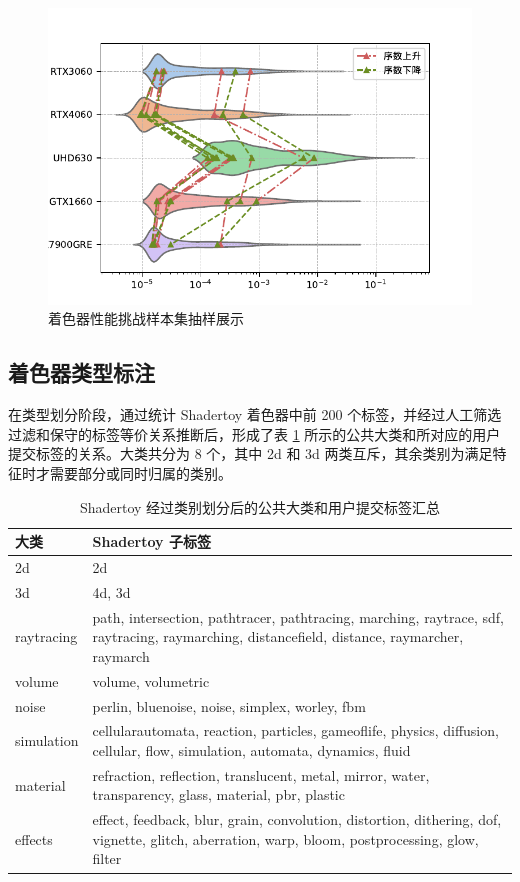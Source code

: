 \begin{figure}[h]
    \centering
    \includegraphics[width=0.8\linewidth]{figures/difficult.pdf}
    \caption{着色器性能挑战样本集抽样展示}
    \label{fig:difficultSamples_ch3}
\end{figure}

\subsection{着色器类型标注}

{\added 在类型划分阶段，通过统计 Shadertoy 着色器中前 200 个标签，并经过人工筛选过滤和保守的标签等价关系推断后，形成了表 \ref{table:tag_classification} 所示的公共大类和所对应的用户提交标签的关系。大类共分为 8 个，其中 2d 和 3d 两类互斥，其余类别为满足特征时才需要部分或同时归属的类别。}

\begin{table}[h]
    \centering
    \caption{Shadertoy 经过类别划分后的公共大类和用户提交标签汇总}
    \label{table:tag_classification}
    \begin{tabular}{p{2cm}|p{11cm}}
        \toprule
        大类 & Shadertoy 子标签 \\
        \midrule
        2d & 2d \\
        3d & 4d, 3d \\
        raytracing & path, intersection, pathtracer, pathtracing, marching, raytrace, sdf, raytracing, raymarching, distancefield, distance, raymarcher, raymarch \\
        volume & volume, volumetric \\
        noise & perlin, bluenoise, noise, simplex, worley, fbm \\
        simulation & cellularautomata, reaction, particles, gameoflife, physics, diffusion, cellular, flow, simulation, automata, dynamics, fluid \\
        material & refraction, reflection, translucent, metal, mirror, water, transparency, glass, material, pbr, plastic \\
        effects & effect, feedback, blur, grain, convolution, distortion, dithering, dof, vignette, glitch, aberration, warp, bloom, postprocessing, glow, filter \\
        \bottomrule
    \end{tabular}
\end{table}

